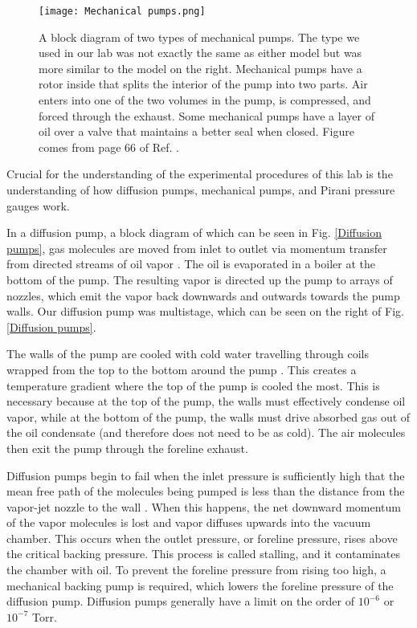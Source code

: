 \documentclass[11pt,letterpaper]{article}
\begin{document}
\begin{figure}
\centerline{\texttt{[image: Mechanical pumps.png]}}
\caption{A block diagram of two types of mechanical pumps. The type we used in our lab was not exactly the same as either model but was more similar to the model on the right. Mechanical pumps have a rotor inside that splits the interior of the pump into two parts. Air enters into one of the two volumes in the pump, is compressed, and forced through the exhaust. Some mechanical pumps have a layer of oil over a valve that maintains a better seal when closed. Figure comes from page 66 of Ref. \cite{Mark}.} \label{Mechanical pumps}
\end{figure}

Crucial for the understanding of the experimental procedures of this lab is the understanding of how diffusion pumps, mechanical pumps, and Pirani pressure gauges work.

In a diffusion pump, a block diagram of which can be seen in Fig. \ref{Diffusion pumps}, gas molecules are moved from inlet to outlet via momentum transfer from directed streams of oil vapor \cite{Moore}. The oil is evaporated in a boiler at the bottom of the pump. The resulting vapor is directed up the pump to arrays of nozzles, which emit the vapor back downwards and outwards towards the pump walls.  Our diffusion pump was multistage, which can be seen on the right of Fig. \ref{Diffusion pumps}.

The walls of the pump are cooled with cold water travelling through coils wrapped from the top to the bottom around the pump \cite{Moore}. This creates a temperature gradient where the top of the pump is cooled the most. This is necessary because at the top of the pump, the walls must effectively condense oil vapor, while at the bottom of the pump, the walls must drive absorbed gas out of the oil condensate (and therefore does not need to be as cold). The air molecules then exit the pump through the foreline exhaust.

Diffusion pumps begin to fail when the inlet pressure is sufficiently high that the mean free path of the molecules being pumped is less than the distance from the vapor-jet nozzle to the wall \cite{Moore}. When this happens, the net downward momentum of the vapor molecules is lost and vapor diffuses upwards into the vacuum chamber. This occurs when the outlet pressure, or foreline pressure, rises above the critical backing pressure. This process is called stalling, and it contaminates the chamber with oil. To prevent the foreline pressure from rising too high, a mechanical backing pump is required, which lowers the foreline pressure of the diffusion pump. Diffusion pumps generally have a limit on the order of $10^{-6}$ or $10^{-7}$ Torr.
\end{document}
